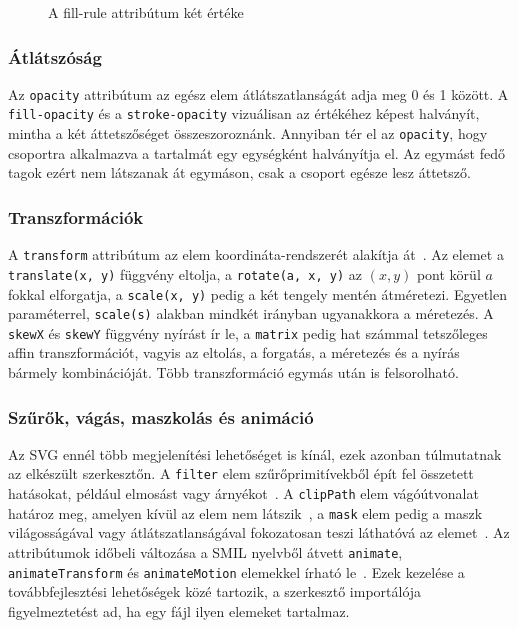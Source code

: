 \begin{figure}[H]
    \centering
    
    \caption{A fill-rule attribútum két értéke}
    \label{fig:example_fill-rule}
\end{figure}

\subsubsection{Átlátszóság}

Az \texttt{opacity} attribútum az egész elem átlátszatlanságát adja meg 0 és 1 között. A \texttt{fill-opacity} és a \texttt{stroke-opacity} vizuálisan az értékéhez képest halványít, mintha a két áttetszőséget összeszoroznánk. Annyiban tér el az \texttt{opacity}, hogy csoportra alkalmazva a tartalmát egy egységként halványítja el. Az egymást fedő tagok ezért nem látszanak át egymáson, csak a csoport egésze lesz áttetsző.

\subsubsection{Transzformációk}

A \texttt{transform} attribútum az elem koordináta-rendszerét alakítja át~\cite{mdn-transform}. Az elemet a \texttt{translate(x, y)} függvény eltolja, a \texttt{rotate(a, x, y)} az $(x, y)$ pont körül $a$ fokkal elforgatja, a \texttt{scale(x, y)} pedig a két tengely mentén átméretezi. Egyetlen paraméterrel, \texttt{scale(s)} alakban mindkét irányban ugyanakkora a méretezés. A \texttt{skewX} és \texttt{skewY} függvény nyírást ír le, a \texttt{matrix} pedig hat számmal tetszőleges affin transzformációt, vagyis az eltolás, a forgatás, a méretezés és a nyírás bármely kombinációját. Több transzformáció egymás után is felsorolható.

\subsubsection{Szűrők, vágás, maszkolás és animáció}

Az SVG ennél több megjelenítési lehetőséget is kínál, ezek azonban túlmutatnak az elkészült szerkesztőn. A \texttt{filter} elem szűrőprimitívekből épít fel összetett hatásokat, például elmosást vagy árnyékot~\cite{mdn-filter}. A \texttt{clipPath} elem vágóútvonalat határoz meg, amelyen kívül az elem nem látszik~\cite{mdn-clippath}, a \texttt{mask} elem pedig a maszk világosságával vagy átlátszatlanságával fokozatosan teszi láthatóvá az elemet~\cite{mdn-mask}. Az attribútumok időbeli változása a SMIL nyelvből átvett \texttt{animate}, \texttt{animateTransform} és \texttt{animateMotion} elemekkel írható le~\cite{mdn-smil}. Ezek kezelése a továbbfejlesztési lehetőségek közé tartozik, a szerkesztő importálója figyelmeztetést ad, ha egy fájl ilyen elemeket tartalmaz.

